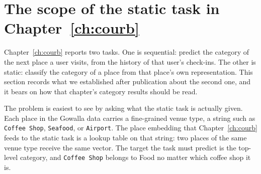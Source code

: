 
\section{The scope of the static task in Chapter~\ref{ch:courb}}
\label{apx:errata:static-scope}

Chapter~\ref{ch:courb} reports two tasks. One is sequential: predict the category of the
next place a user visits, from the history of that user's check-ins. The other is static:
classify the category of a place from that place's own representation. This section
records what we established after publication about the second one, and it bears on how
that chapter's category results should be read.

%
The problem is easiest to see by asking what the static task is actually given. Each place in the
Gowalla data carries a fine-grained venue type, a string such as \texttt{Coffee Shop},
\texttt{Seafood}, or \texttt{Airport}. The place embedding that Chapter~\ref{ch:courb} feeds to the
static task is a lookup table on that string: two places of the same venue type receive the same
vector. The target the task must predict is the top-level category, and \texttt{Coffee Shop} belongs
to Food no matter which coffee shop it is.

